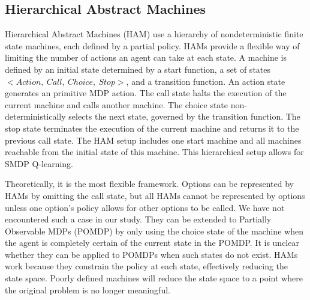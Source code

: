 \subsection{Hierarchical Abstract Machines}

Hierarchical Abstract Machines (HAM) use a hierarchy of nondeterministic finite state machines, each defined by a partial policy.
HAMs provide a flexible way of limiting the number of actions an agent can take at each state.
A machine is defined by an initial state determined by a start function, a set of states $<Action,\ Call,\ Choice,\ Stop>$, and a transition function.
An action state generates
an primitive MDP action. The call state halts the
execution of the current machine and calls another
machine. The choice state non-deterministically selects the next state, governed by the transition function. The
stop state terminates the execution of the current machine and returns it to the previous call state. The HAM setup includes one start machine and all machines reachable from the initial state of this machine. This hierarchical setup allows for SMDP Q-learning. \cite{Parr}

Theoretically, it is the most flexible framework. Options can be represented
by HAMs by omitting the call state, but all HAMs cannot be represented by
options unless one option's policy allows for other options to be called. We
have not encountered such a case in our study. They can be extended to Partially Observable MDPs (POMDP)
by only using the choice state of the machine when the agent is completely
certain of the current state in the POMDP. It is unclear whether they can be
applied to POMDPs when such states do not exist. HAMs work because they
constrain the policy at each state, effectively reducing the state space.
Poorly defined machines will reduce the state space to a point where the
original problem is no longer meaningful.
